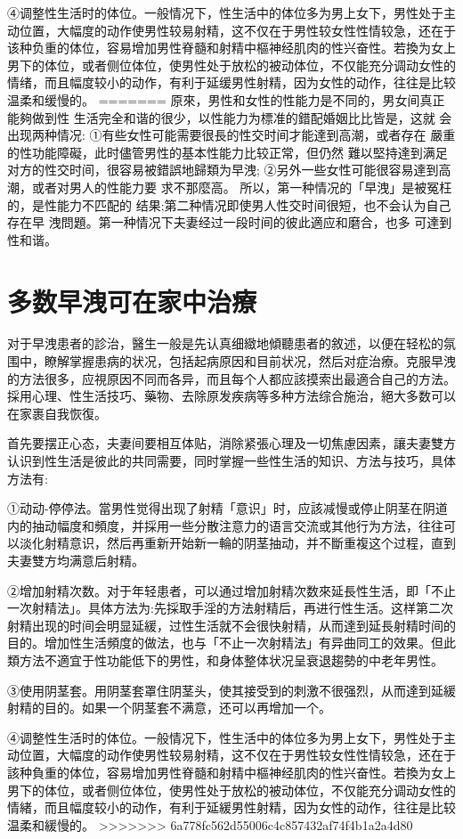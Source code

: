 \documentclass[12pt,UTF8]{ctexbook}
\begin{document}
④调整性生活时的体位。一般情况下，性生活中的体位多为男上女下，男性处于主动位置，大幅度的动作使男性较易射精，这不仅在于男性较女性性情较急，还在于该种负重的体位，容易增加男性脊髓和射精中樞神经肌肉的性兴奋性。若換为女上男下的体位，或者侧位体位，使男性处于放松的被动体位，不仅能充分调动女性的情绪，而且幅度较小的动作，有利于延缓男性射精，因为女性的动作，往往是比较温柔和缓慢的。
=======
原來，男性和女性的性能力是不同的，男女间真正能夠做到性
生活完全和谐的很少，以性能力为標准的錯配婚姻比比皆是，这就
会出现两种情况:
①有些女性可能需要很長的性交时间才能達到高潮，或者存在
嚴重的性功能障礙，此时儘管男性的基本性能力比较正常，但仍然
難以堅持達到满足对方的性交时间，很容易被錯誤地歸類为早洩;
②另外一些女性可能很容易達到高潮，或者对男人的性能力要
求不那麼高。
所以，第一种情况的「早洩」是被冤枉的，是性能力不匹配的
结果;第二种情况即使男人性交时间很短，也不会认为自己存在早
洩問題。第一种情况下夫妻经过一段时间的彼此適应和磨合，也多
可達到性和谐。

\section{多数早洩可在家中治療}

对于早洩患者的診治，醫生一般是先认真细緻地傾聽患者的敘述，以便在轻松的氛围中，瞭解掌握患病的状况，包括起病原因和目前状况，然后对症治療。克服早洩的方法很多，应視原因不同而各异，而且每个人都应該摸索出最適合自己的方法。採用心理、性生活技巧、藥物、去除原发疾病等多种方法综合施治，絕大多数可以在家裹自我恢復。

首先要摆正心态，夫妻间要相互体贴，消除紧張心理及一切焦慮因素，讓夫妻雙方认识到性生活是彼此的共同需要，同时掌握一些性生活的知识、方法与技巧，具体方法有:

①动动-停停法。當男性觉得出现了射精「意识」时，应該减慢或停止阴茎在阴道内的抽动幅度和頻度，并採用一些分散注意力的语言交流或其他行为方法，往往可以淡化射精意识，然后再重新开始新一輪的阴茎抽动，并不斷重複这个过程，直到夫妻雙方均满意后射精。

②增加射精次数。对于年轻患者，可以通过增加射精次数來延長性生活，即「不止一次射精法」。具体方法为:先採取手淫的方法射精后，再进行性生活。这样第二次射精出现的时间会明显延緩，过性生活就不会很快射精，从而達到延長射精时间的目的。增加性生活頻度的做法，也与「不止一次射精法」有异曲同工的效果。但此類方法不適宜于性功能低下的男性，和身体整体状况呈衰退趨勢的中老年男性。

③使用阴茎套。用阴茎套罩住阴茎头，使其接受到的刺激不很强烈，从而達到延緩射精的目的。如果一个阴茎套不满意，还可以再增加一个。

④调整性生活时的体位。一般情况下，性生活中的体位多为男上女下，男性处于主动位置，大幅度的动作使男性较易射精，这不仅在于男性较女性性情较急，还在于該种負重的体位，容易增加男性脊髓和射精中樞神经肌肉的性兴奋性。若換为女上男下的体位，或者侧位体位，使男性处于放松的被动体位，不仅能充分调动女性的情緒，而且幅度较小的动作，有利于延緩男性射精，因为女性的动作，往往是比较温柔和緩慢的。
>>>>>>> 6a778fc562d55006c4c857432af74f4b1a2a4d80
\end{document}
